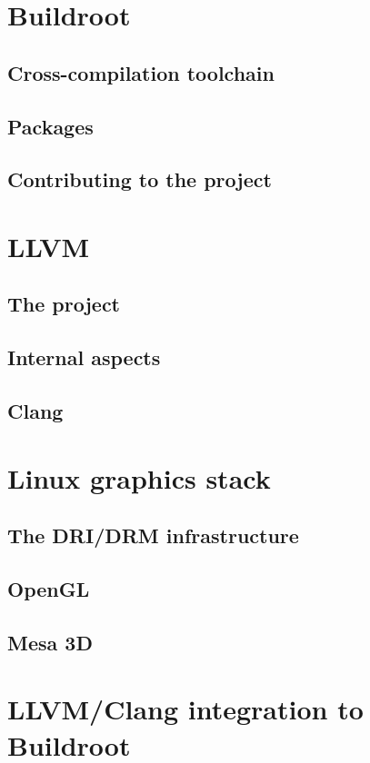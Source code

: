 \documentclass[12pt,a4paper,oneside]{article}
\begin{document}
\newpage
\section{Buildroot}
\subsection{Cross-compilation toolchain}
\subsection{Packages}
\subsection{Contributing to the project}

\newpage
\section{LLVM}
\subsection{The project}
\subsection{Internal aspects}
\subsection{Clang}

\newpage
\section{Linux graphics stack}
\subsection{The DRI/DRM infrastructure}
\subsection{OpenGL}
\subsection{Mesa 3D}

\newpage
\section{LLVM/Clang integration to Buildroot}
\end{document}
